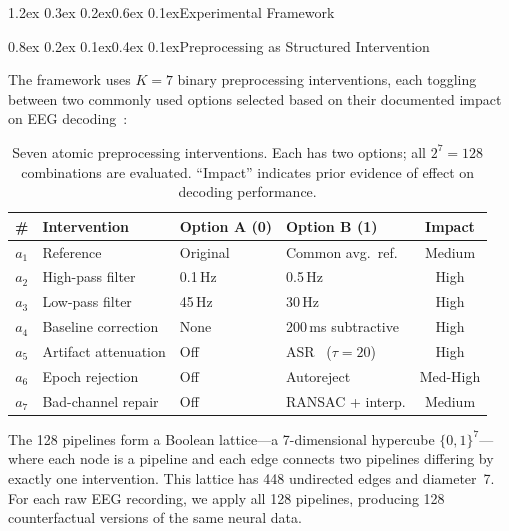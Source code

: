 \documentclass{article}
\makeatletter
\renewcommand{\section}{\@startsection{section}{1}{\z@}%
  {1.2ex \@plus 0.3ex \@minus 0.2ex}{0.6ex \@plus 0.1ex}{\large\bf}}
\renewcommand{\subsection}{\@startsection{subsection}{2}{\z@}%
  {0.8ex \@plus 0.2ex \@minus 0.1ex}{0.4ex \@plus 0.1ex}{\normalsize\bf}}
\makeatother
\begin{document}

\section{Experimental Framework}
\label{sec:framework}

\subsection{Preprocessing as Structured Intervention}
\label{sec:interventions}

The framework uses $K{=}7$ binary preprocessing interventions, each toggling between two commonly used options selected based on their documented impact on EEG decoding~\citep{kessler2025preprocessing,delpup2025more}:

\begin{table}[h]
\centering
\caption{Seven atomic preprocessing interventions. Each has two options; all $2^7{=}128$ combinations are evaluated. ``Impact'' indicates prior evidence of effect on decoding performance.}
\label{tab:interventions}
\small
\begin{tabular}{@{}clllc@{}}
\toprule
\# & Intervention & Option A (0) & Option B (1) & Impact \\
\midrule
$a_1$ & Reference & Original & Common avg.\ ref. & Medium \\
$a_2$ & High-pass filter & 0.1\,Hz & 0.5\,Hz & High \\
$a_3$ & Low-pass filter & 45\,Hz & 30\,Hz & High \\
$a_4$ & Baseline correction & None & 200\,ms subtractive & High \\
$a_5$ & Artifact attenuation & Off & ASR~\citep{chang2020eeglab} ($\tau{=}20$) & High \\
$a_6$ & Epoch rejection & Off & Autoreject~\citep{jas2017autoreject} & Med-High \\
$a_7$ & Bad-channel repair & Off & RANSAC + interp. & Medium \\
\bottomrule
\end{tabular}
\end{table}

The 128 pipelines form a Boolean lattice---a 7-dimensional hypercube $\{0,1\}^7$---where each node is a pipeline and each edge connects two pipelines differing by exactly one intervention. This lattice has 448 undirected edges and diameter~7. For each raw EEG recording, we apply all 128 pipelines, producing 128 counterfactual versions of the same neural data.
\end{document}
